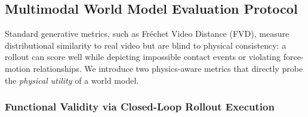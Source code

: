 \documentclass{article}
\begin{document}



\subsection{Multimodal World Model Evaluation Protocol}
\label{subsec:wm_eval_propocol}

Standard generative metrics, such as Fr\'{e}chet Video Distance (FVD), measure distributional similarity to real video but are blind to physical consistency: a rollout can score well while depicting impossible contact events or violating force-motion relationships. We introduce two physics-aware metrics that directly probe the \emph{physical utility} of a world model.

\subsubsection{Functional Validity via Closed-Loop Rollout Execution}
\label{method:CLRS}
\end{document}
